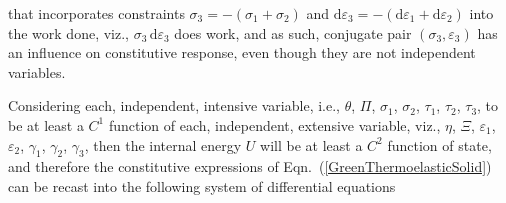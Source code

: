 that incorporates constraints $\sigma_3 = -(\sigma_1 + \sigma_2)$ and $\mathrm{d} \varepsilon_3 = -( \mathrm{d} \varepsilon_1 + \mathrm{d} \varepsilon_2 )$ into the work done, viz., $\sigma_3 \, \mathrm{d} \varepsilon_3$ does work, and as such, conjugate pair $( \sigma_3 , \varepsilon_3 )$ has an influence on constitutive response, even though they are not independent variables.

Considering each, independent, intensive variable, i.e., $\theta$, $\Pi$, $\sigma_1$, $\sigma_2$, $\tau_1$, $\tau_2$, $\tau_3$, to be at least a $C^1$ function of each, independent, extensive variable, viz., $\eta$, $\Xi$, $\varepsilon_1$, $\varepsilon_2$, $\gamma_1$, $\gamma_2$, $\gamma_3$, then the internal energy $U$ will be at least a $C^2$ function of state, and therefore the constitutive expressions of Eqn.~(\ref{GreenThermoelasticSolid}) can be recast into the following system of differential equations
\footnotesize
